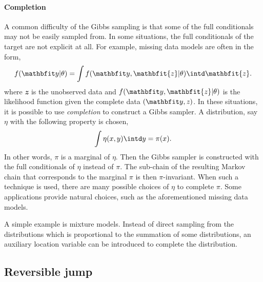 

\paragraph{Completion}

A common difficulty of the Gibbs sampling is that some of the full conditionals may not be easily sampled from. In some situations, the full conditionals of the target are not explicit at all. For example, missing data models are often in the form,
\begin{equation*}
  f(\data|\theta) = \int f(\data, \mathbfit{z}|\theta)\intd \mathbfit{z}.
\end{equation*}
where $\mathbfit{z}$ is the unobserved data and $f(\data,\mathbfit{z}|\theta)$ is the likelihood function given the complete data $(\data,\mathit{z})$. In these situations, it is possible to use \emph{completion} to construct a Gibbs sampler. A distribution, say $\eta$ with the following property is chosen,
\begin{equation}
  \int\eta(x,y)\intd y = \pi(x).
\end{equation}
In other words, $\pi$ is a marginal of $\eta$. Then the Gibbs sampler is constructed with the full conditionals of $\eta$ instead of $\pi$. The sub-chain of the resulting Markov chain that corresponds to the marginal $\pi$ is then $\pi$-invariant. When such a technique is used, there are many possible choices of $\eta$ to complete $\pi$. Some applications provide natural choices, such as the aforementioned missing data models.
\begin{draftnote}
A simple example is mixture models. Instead of direct sampling from the distributions which is proportional to the summation of some distributions, an auxiliary location variable can be introduced to complete the distribution.
\end{draftnote}

\subsection{Reversible jump \protect\mcmc}
\label{sub:Reversible jump mcmc}

